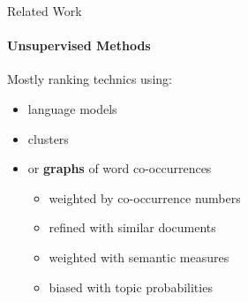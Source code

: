   \begin{frame}{Related Work}
    \framesubtitle{Unsupervised Methods}

    Mostly ranking technics using:
    \begin{itemize}
      \item{language models~\cite{tomokiyo2003languagemodel}}
      \item{clusters~\cite{liu2009keycluster}}
      \item{or \textbf{graphs} of word
            co-occurrences~\cite{mihalcea2004textrank}}
      \begin{itemize}
        \item<2->{weighted by co-occurrence numbers~\cite{wan2008expandrank}}
        \item<2->{refined with similar documents~\cite{wan2008expandrank}}
        \item<2->{weighted with semantic
                  measures~\cite{tsatsaronis2010semanticrank}}
        \item<2->{biased with topic probabilities~\cite{liu2010topicalpagerank}}
      \end{itemize}
    \end{itemize}
  \end{frame}

